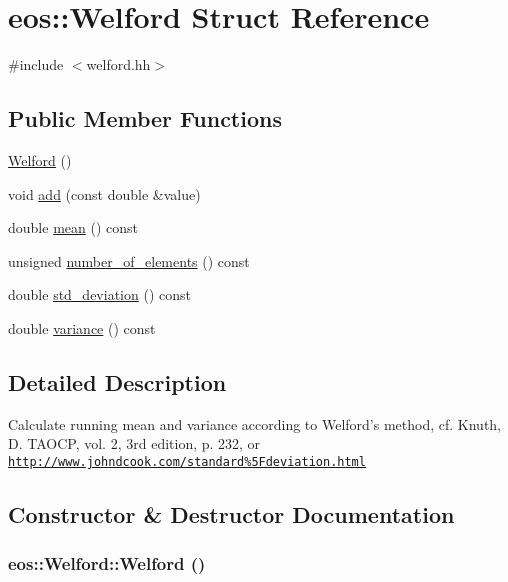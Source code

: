 \hypertarget{structeos_1_1Welford}{
\section{eos::Welford Struct Reference}
\label{structeos_1_1Welford}
}


{\ttfamily \#include $<$welford.hh$>$}\subsection*{Public Member Functions}
\begin{DoxyCompactItemize}
\item 
\hyperlink{structeos_1_1Welford_aa8a5cede9b83f8407c0475278fb3929d}{Welford} ()
\item 
void \hyperlink{structeos_1_1Welford_a42e2ae402d7f7944fea47ab9676d3ba5}{add} (const double \&value)
\item 
double \hyperlink{structeos_1_1Welford_a4ee0383dc9fc04f9319205ed7c39e6bc}{mean} () const 
\item 
unsigned \hyperlink{structeos_1_1Welford_a3cbe78c6143406e01dfaff70fac96ecd}{number\_\-of\_\-elements} () const 
\item 
double \hyperlink{structeos_1_1Welford_af2d5839b48295d51d5d97e4f6cb889ba}{std\_\-deviation} () const 
\item 
double \hyperlink{structeos_1_1Welford_a08c2dfcf9277822ed83ac7181ec46d6a}{variance} () const 
\end{DoxyCompactItemize}


\subsection{Detailed Description}
Calculate running mean and variance according to Welford's method, cf. Knuth, D. TAOCP, vol. 2, 3rd edition, p. 232, or \href{http://www.johndcook.com/standard%5Fdeviation.html}{\tt http://www.johndcook.com/standard\%5Fdeviation.html} 

\subsection{Constructor \& Destructor Documentation}
\hypertarget{structeos_1_1Welford_aa8a5cede9b83f8407c0475278fb3929d}{
\subsubsection[{Welford}]{\setlength{\rightskip}{0pt plus 5cm}eos::Welford::Welford ()}}
\label{structeos_1_1Welford_aa8a5cede9b83f8407c0475278fb3929d}


